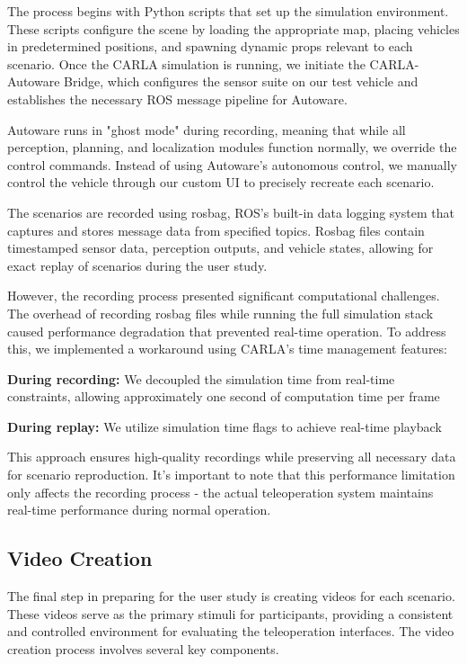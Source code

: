 The process begins with Python scripts that set up the simulation environment. These scripts configure the scene by loading the appropriate map, placing vehicles in predetermined positions, and spawning dynamic props relevant to each scenario. Once the CARLA simulation is running, we initiate the CARLA-Autoware Bridge, which configures the sensor suite on our test vehicle and establishes the necessary ROS message pipeline for Autoware.

Autoware runs in "ghost mode" during recording, meaning that while all perception, planning, and localization modules function normally, we override the control commands. Instead of using Autoware's autonomous control, we manually control the vehicle through our custom UI to precisely recreate each scenario.

The scenarios are recorded using rosbag, ROS's built-in data logging system that captures and stores message data from specified topics. Rosbag files contain timestamped sensor data, perception outputs, and vehicle states, allowing for exact replay of scenarios during the user study.

However, the recording process presented significant computational challenges. The overhead of recording rosbag files while running the full simulation stack caused performance degradation that prevented real-time operation. To address this, we implemented a workaround using CARLA's time management features:

\textbf{During recording:} We decoupled the simulation time from real-time constraints, allowing approximately one second of computation time per frame

\textbf{During replay:} We utilize simulation time flags to achieve real-time playback

This approach ensures high-quality recordings while preserving all necessary data for scenario reproduction. It's important to note that this performance limitation only affects the recording process - the actual teleoperation system maintains real-time performance during normal operation.

\subsection{Video Creation}
The final step in preparing for the user study is creating videos for each scenario. These videos serve as the primary stimuli for participants, providing a consistent and controlled environment for evaluating the teleoperation interfaces. The video creation process involves several key components.

